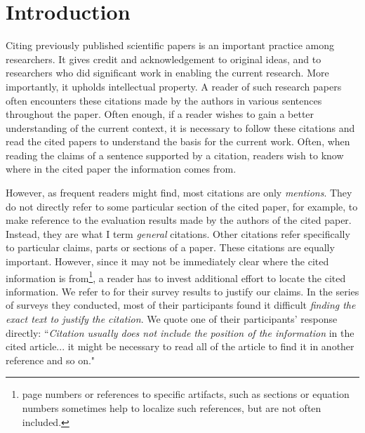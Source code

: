 \chapter{Introduction}
\label{introduction}
Citing previously published scientific papers is an important practice among researchers. It gives credit and acknowledgement to original ideas, and to researchers who did significant work in enabling the current research.  More importantly, it upholds intellectual property. A reader of such research papers often encounters these citations made by the authors in various sentences throughout the paper. Often enough, if a reader wishes to gain a better understanding of the current context, it is necessary to follow these citations and read the cited papers to understand the basis for the current work.  Often, when reading the claims of a sentence supported by a citation, readers wish to know where in the cited paper the information comes from.  

However, as frequent readers might find, most citations are only \textit{mentions}. They do not directly refer to some particular section of the cited paper, for example, to make reference to the evaluation results made by the authors of the cited paper. Instead, they are what I term {\it general} citations. Other citations refer specifically to particular claims, parts or sections of a paper.  These citations are equally important.  However, since it may not be immediately clear where the cited information is from\footnote{page numbers or references to specific artifacts, such as sections or equation numbers sometimes help to localize such references, but are not often included.}, a reader has to invest additional effort to locate the cited information. We refer to \cite{citation-sensitive} for their survey results to justify our claims. In the series of surveys they conducted, most of their participants found it difficult \textit{finding the exact text to justify the citation}. We quote one of their participants' response directly: ``\textit{Citation usually does not include the position of the information} in the cited article... it might be necessary to read all of the article to find it in another reference and so on." \cite{citation-sensitive}

